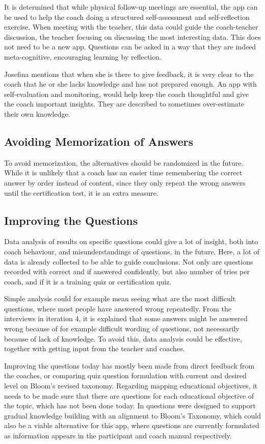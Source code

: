 It is determined that while physical follow-up meetings are essential, the app can be used to help the coach doing a structured self-assessment and self-reflection exercise. When meeting with the teacher, this data could guide the coach-teacher discussion, the teacher focusing on discussing the most interesting data. This does not need to be a new app. Questions can be asked in a way that they are indeed meta-cognitive, encouraging learning by reflection.

Josefina mentions that when she is there to give feedback, it is very clear to the coach that he or she lacks knowledge and has not prepared enough. An app with self-evaluation and monitoring, would help keep the coach thoughtful and give the coach important insights. They are described to sometimes over-estimate their own knowledge.

\subsection{Avoiding Memorization of Answers}
To avoid memorization, the alternatives should be randomized in the future. While it is unlikely that a coach has an easier time remembering the correct answer by order instead of content, since they only repeat the wrong answers until the certification test, it is an extra measure.

\subsection{Improving the Questions}
Data analysis of results on specific questions could give a lot of insight, both into coach behaviour, and misunderstandings of questions, in the future. Here, a lot of data is already collected to be able to guide conclusions. Not only are questions recorded with correct and if answered confidently, but also number of tries per coach, and if it is a training quiz or certification quiz.

Simple analysis could for example mean seeing what are the most difficult questions, where most people have answered wrong repeatedly. From the interviews in iteration 4, it is explained that some answers might be answered wrong because of for example difficult wording of questions, not necessarily because of lack of knowledge. To avoid this, data analysis could be effective, together with getting input from the teacher and coaches.

Improving the questions today has mostly been made from direct feedback from the coaches, or comparing quiz question formulation with current and desired level on Bloom's revised taxonomy. Regarding mapping educational objectives, it needs to be made sure that there are questions for each educational objective of the topic, which has not been done today. In \cite{yengin} questions were designed to support gradual knowledge building with an alignment to Bloom’s Taxonomy, which could also be a viable alternative for this app, where questions are currently formulated as information appears in the participant and coach manual respectively.
